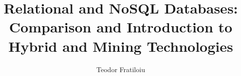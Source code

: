 \documentclass[10pt,        %
               a4paper,     %
               journal,     %
               ]{IEEEtran}
\makeatletter
\def\markboth#1#2{\def\leftmark{\@IEEEcompsoconly{\sffamily}\MakeUppercase{\protect#1}}%
\def\rightmark{\@IEEEcompsoconly{\sffamily}\MakeUppercase{\protect#2}}}
\makeatother
\begin{document}
\title{Relational and NoSQL Databases: Comparison and Introduction to Hybrid and Mining Technologies}


\author{Teodor Fratiloiu}%

% 
%

\markboth{Scientific Seminar on Security in Information Technology, Winter Semester 2020/2021}%
{Teodor Fratiloiu: Comparison of SQL Relational Databases and NoSQL Graph Databases}

% 
\end{document}
